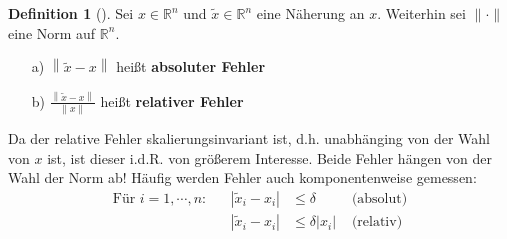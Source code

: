 \documentclass[ngerman,fontsize=11pt, paper=a4, parskip=half, titlepage=true, toc=bib]{scrbook}
\theoremstyle{definition}
\newtheorem{Def}{Definition}[section]		%
\theoremstyle{plain}
\newcommand{\R}{\mathds{R}}
\newcommand{\nn}[1]{\left\| #1 \right\|}
\newcommand{\subsectione}[1]{\addtocounter{Def}{1}\subsection{#1}}
\newenvironment{Defe}[1][]{ %
	\begin{Def}[#1]
	}
	{
	\end{Def}
	\addtocounter{subsection}{1}
}
\begin{document}
\begin{Defe}
	\label{3.2.2} 
	Sei $x\in\R^n$ und $\widetilde{x} \in \R^n$ eine Näherung an $x$. Weiterhin sei $\|\cdot\|$ eine Norm auf $\R^n$.
	\begin{itemize}
		\item[a)] $\nn{\widetilde{x} - x}$ heißt \textbf{absoluter Fehler} 
		\item[b)] $\frac{\nn{\widetilde{x} - x}}{\nn{x}}$ heißt \textbf{relativer Fehler}
	\end{itemize}
	Da der relative Fehler skalierungsinvariant ist, d.h. unabhänging von der  Wahl von $x$ ist, ist dieser i.d.R. von größerem Interesse.
	Beide Fehler hängen von der Wahl der Norm ab!
	Häufig werden Fehler auch komponentenweise gemessen:
	\begin{align*}
	\text{Für } i=1,\cdots , n : && |\widetilde{x}_i - x_i | & \leq \delta & \text{ (absolut)} \\
	&& |\widetilde{x}_i - x_i | &\leq \delta |x_i| & \text{ (relativ)}
	\end{align*}
\end{Defe}
\end{document}
